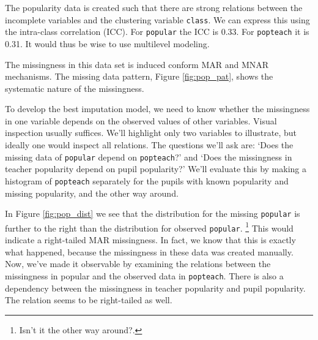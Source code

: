 \documentclass[
]{jss}
\begin{document}
The popularity data is created such that there are strong relations
between the incomplete variables and the clustering variable
\texttt{class}. We can express this using the intra-class correlation
(ICC). For \texttt{popular} the ICC is 0.33. For \texttt{popteach} it is
0.31. It would thus be wise to use multilevel modeling.

The missingness in this data set is induced conform MAR and MNAR
mechanisms. The missing data pattern, Figure \ref{fig:pop_pat}, shows
the systematic nature of the missingness.

To develop the best imputation model, we need to know whether the
missingness in one variable depends on the observed values of other
variables. Visual inspection usually suffices. We'll highlight only two
variables to illustrate, but ideally one would inspect all relations.
The questions we'll ask are: `Does the missing data of \texttt{popular}
depend on \texttt{popteach}?' and `Does the missingness in teacher
popularity depend on pupil popularity?' We'll evaluate this by making a
histogram of \texttt{popteach} separately for the pupils with known
popularity and missing popularity, and the other way around.

In Figure \ref{fig:pop_dist} we see that the distribution for the
missing \texttt{popular} is further to the right than the distribution
for observed \texttt{popular}. \footnote{Isn't it the other way around?.}
This would indicate a right-tailed MAR missingness. In fact, we know
that this is exactly what happened, because the missingness in these
data was created manually. Now, we've made it observable by examining
the relations between the missingness in popular and the observed data
in \texttt{popteach}. There is also a dependency between the missingness
in teacher popularity and pupil popularity. The relation seems to be
right-tailed as well.
\end{document}
